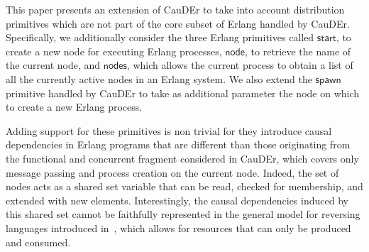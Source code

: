\documentclass[runningheads]{llncs}
\newcommand{\ms}[1]{\mathsf{#1}}
\begin{document}
%
%

This paper presents an extension of CauDEr to take into account distribution primitives which are not part of the 
core subset of Erlang handled by CauDEr. Specifically,
we additionally consider the three Erlang primitives called 
$\ms{start}$, to create a new node for executing Erlang processes,
$\ms{node}$, to retrieve the name of the current node, and 
$\ms{nodes}$, which allows the current process to obtain a list of all the currently active nodes in an Erlang system.
We also extend the $\ms{spawn}$ primitive handled by CauDEr to take as additional parameter the node on which to create a new Erlang process.

Adding support for these primitives is non trivial for they introduce causal dependencies in Erlang programs
that are different than those originating from the functional and concurrent
fragment considered in CauDEr, which covers only message passing and process creation on the current node.
Indeed, the set of nodes acts as a shared set variable that can be read, checked for membership, and extended with new elements.
Interestingly, the causal dependencies induced by this shared set cannot be faithfully represented in the general model
for reversing languages introduced in~\cite{LaneseM20}, which allows for resources that can only be produced and
consumed.
\end{document}
